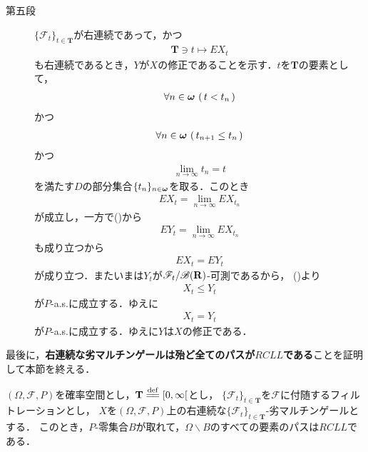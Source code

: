 \begin{sketch}
\begin{description}
			\item[第五段]
				$\{\mathscr{F}_t\}_{t \in \mathbf{T}}$が右連続であって，かつ
				\begin{align}
					\mathbf{T} \ni t \longmapsto EX_t
				\end{align}
				も右連続であるとき，$Y$が$X$の修正であることを示す．$t$を$\mathbf{T}$の要素として，
				\begin{align}
					\forall n \in {\boldsymbol \omega}\, \left(\, t < t_n\, \right)
				\end{align}
				かつ
				\begin{align}
					\forall n \in {\boldsymbol \omega}\, \left(\, t_{n+1} \leq t_n\, \right)
				\end{align}
				かつ
				\begin{align}
					\lim_{n \to \infty} t_n = t
				\end{align}
				を満たす$D$の部分集合$\{t_n\}_{n \in {\boldsymbol \omega}}$を取る．このとき
				\begin{align}
					EX_t = \lim_{n \to \infty} EX_{t_n}
				\end{align}
				が成立し，一方で()から
				\begin{align}
					EY_t = \lim_{n \to \infty} EX_{t_n}
				\end{align}
				も成り立つから
				\begin{align}
					EX_t = EY_t
				\end{align}
				が成り立つ．またいまは$Y_t$が$\mathscr{F}_t/\mathscr{B}(\mathbf{R})$-可測であるから，
				()より
				\begin{align}
					X_t \leq Y_t
				\end{align}
				が$P$-a.s.に成立する．ゆえに
				\begin{align}
					X_t = Y_t
				\end{align}
				が$P$-a.s.に成立する．ゆえに$Y$は$X$の修正である．
				\QED
		\end{description}
	\end{sketch}
	
	最後に，{\bf 右連続な劣マルチンゲールは殆ど全てのパスが$RCLL$である}ことを証明して本節を終える．
	
	\begin{screen}
		\begin{thm}[パスの正則性]
			$(\Omega,\mathscr{F},P)$を確率空間とし，$\mathbf{T} \defeq [0,\infty[$とし，
			$\{\mathscr{F}_t\}_{t \in \mathbf{T}}$を$\mathscr{F}$に付随するフィルトレーションとし，
			$X$を$(\Omega,\mathscr{F},P)$上の右連続な$\{\mathscr{F}_t\}_{t \in \mathbf{T}}$-劣マルチンゲールとする．
			このとき，$P$-零集合$B$が取れて，$\Omega \backslash B$のすべての要素のパスは$RCLL$である．
		\end{thm}
	\end{screen}
	

